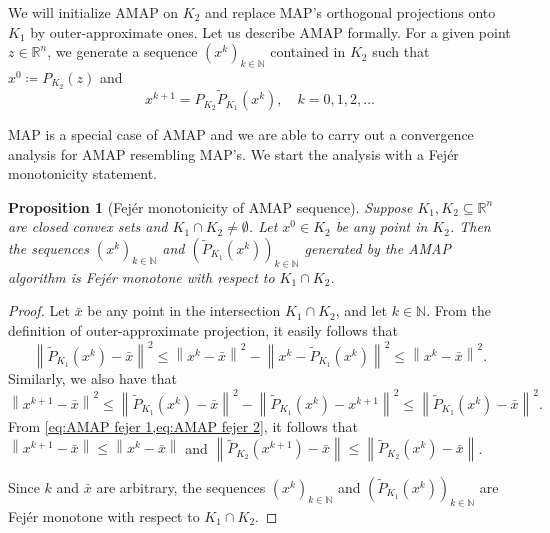 \documentclass[smallextended,numbook,nospthms]{svjour3}
\theoremstyle{plain}
\newtheorem{proposition}[theorem]{Proposition}
\theoremstyle{definition}
\def\RR{\mathds R}
\def\NN{\mathds N}
\begin{document}
We will initialize AMAP on $K_{2}$ and replace MAP's orthogonal projections onto $K_1$ by outer-approximate ones. Let us describe AMAP formally. For a given point $z \in \RR^{n}$, we generate a sequence $\left(x^{k}\right)_{k \in \NN}$ contained in $K_{2}$ such that $x^{0} \coloneqq P_{K_{2}}(z)$ and
$$
x^{k+1}=P_{K_{2}}\tilde{P}_{K_{1}}\left(x^{k}\right), \quad k=0,1,2, \ldots
$$

MAP is a special case of AMAP and we are able to carry out a convergence analysis for AMAP resembling MAP's. We start the analysis with a Fejér monotonicity statement.

\begin{proposition}[Fejér monotonicity of AMAP sequence]\label{prop:AMAP Fejer}
	Suppose $K_{1},K_{2} \subseteq \RR^{n}$ are closed convex sets and $K_{1} \cap K_{2} \neq \emptyset$. Let $x^{0} \in K_{2}$ be any point in $K_{2}$. Then the sequences $\left(x^{k}\right)_{k \in \NN}$ and $\left(\tilde{P}_{K_{1}}\left(x^{k}\right)\right)_{k \in \NN}$ generated by the AMAP algorithm is Fejér monotone with respect to $K_{1} \cap K_{2}$.
\end{proposition}
\begin{proof}
	Let $\bar{x}$ be any point in the intersection $K_{1} \cap K_{2}$, and let $k \in \NN$. From the definition of outer-approximate projection, it easily follows that
	\begin{equation}\label{eq:AMAP fejer 1}
		\left\|\tilde{P}_{K_{1}}\left(x^{k}\right)-\bar{x}\right\|^{2} \leq \left\|x^{k}-\bar{x}\right\|^{2} - \left\|x^{k}-\tilde{P}_{K_{1}}\left(x^{k}\right)\right\|^{2} \leq \left\|x^{k}-\bar{x}\right\|^{2}.
	\end{equation}
	Similarly, we also have that
	\begin{equation}\label{eq:AMAP fejer 2}
		\left\|x^{k+1}-\bar{x}\right\|^{2} \leq \left\|\tilde{P}_{K_{1}}\left(x^{k}\right)-\bar{x}\right\|^{2} - \left\|\tilde{P}_{K_{1}}\left(x^{k}\right)-x^{k+1}\right\|^{2} \leq \left\|\tilde{P}_{K_{1}}\left(x^{k}\right)-\bar{x}\right\|^{2}.
	\end{equation}
	From \cref{eq:AMAP fejer 1,eq:AMAP fejer 2}, it follows that $\left\|x^{k+1}-\bar{x}\right\| \leq \left\|x^{k}-\bar{x}\right\|$
	and $\left\|\tilde{P}_{K_{2}}\left(x^{k+1}\right)-\bar{x}\right\| \leq \left\|\tilde{P}_{K_{2}}\left(x^{k}\right)-\bar{x}\right\|$.

	Since $k$ and $\bar{x}$ are arbitrary, the sequences $\left(x^{k}\right)_{k \in \NN}$ and $\left(\tilde{P}_{K_{1}}\left(x^{k}\right)\right)_{k \in \NN}$ are Fejér monotone with respect to $K_1 \cap K_2$.
\end{proof}
\end{document}
